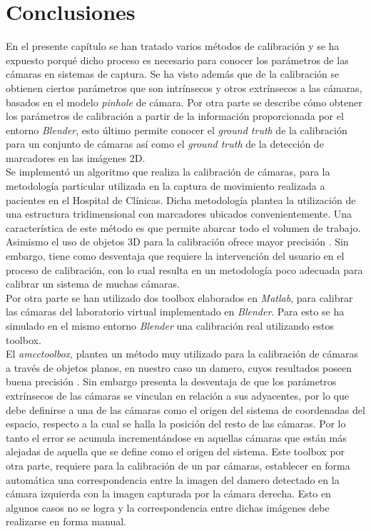 \section{Conclusiones}

En el presente capítulo se han tratado varios métodos de calibración y se ha expuesto porqué dicho proceso es necesario para conocer los parámetros de las cámaras en sistemas de captura. Se ha visto además que de la calibración se obtienen ciertos parámetros que son intrínsecos y otros extrínsecos a las cámaras, basados en el modelo \textit{pinhole} de cámara. Por otra parte se describe cómo obtener los parámetros de calibración a partir de la información proporcionada por el entorno \emph{Blender}, esto último permite conocer el \textit{ground truth} de la calibración para un conjunto de cámaras así como el \textit{ground truth} de la detección de marcadores en las imágenes 2D.\\

Se implementó un algoritmo que realiza la calibración de cámaras, para la metodología particular utilizada en la captura de movimiento realizada a pacientes en el Hospital de Clínicas. Dicha metodología plantea la utilización de una estructura tridimensional con marcadores ubicados convenientemente. Una característica de este método es que permite abarcar todo el volumen de trabajo. Asimismo el uso de objetos 3D para la calibración ofrece mayor precisión \cite{zhang_libro}. Sin embargo, tiene como desventaja que requiere la intervención del usuario en el proceso de calibración, con lo cual resulta en un metodología poco adecuada para calibrar un sistema de muchas cámaras.\\


Por otra parte se han utilizado dos toolbox elaborados en \emph{Matlab}, para calibrar las cámaras del laboratorio virtual implementado en \emph{Blender}. Para esto se ha simulado en el mismo entorno \emph{Blender} una calibración real utilizando estos toolbox.\\


El \textit{amcctoolbox}, plantea un método muy utilizado para la calibración de cámaras a través de objetos planos, en nuestro caso un damero, cuyos resultados poseen buena precisión \cite{zhang_libro}. Sin embargo presenta la desventaja de que los parámetros extrínsecos de las cámaras se vinculan en relación a sus adyacentes, por lo que debe definirse a una de las cámaras como el origen del sistema de coordenadas del espacio, respecto a la cual se halla la posición del resto de las cámaras. Por lo tanto el error se acumula incrementándose en aquellas cámaras que están más alejadas de aquella que se define como el origen del sistema. Este toolbox por otra parte, requiere para la calibración de un par cámaras, establecer en forma automática una correspondencia entre la imagen del damero detectado en la cámara izquierda con la imagen capturada por la cámara derecha. Esto en algunos casos no se logra y la correspondencia entre dichas imágenes debe realizarse en forma manual. \\


